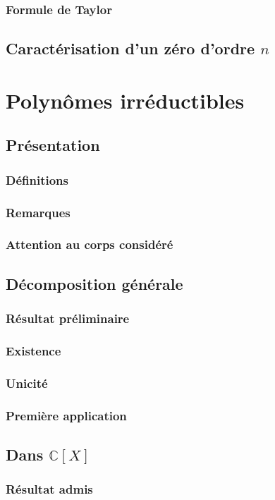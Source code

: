 \documentclass[12pt,a4paper,french]{book}
\begin{document}
			\subsubsection{Formule de Taylor}
		\subsection{Caractérisation d'un zéro d'ordre $n$}
	\section{Polynômes irréductibles}
		\subsection{Présentation}
			\subsubsection{Définitions}
			\subsubsection{Remarques}
			\subsubsection{Attention au corps considéré}
		\subsection{Décomposition générale}
			\subsubsection{Résultat préliminaire}
			\subsubsection{Existence}
			\subsubsection{Unicité}
			\subsubsection{Première application}
		\subsection{Dans $\mathbb{C}[X]$}
			\subsubsection{Résultat admis}
\end{document}
